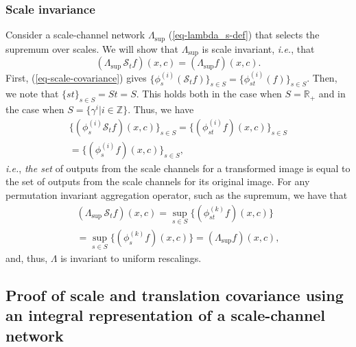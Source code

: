 \documentclass[twocolumn,runningheads]{svjour3}
\def\bbbr{{\mathbb R}}
\def\bbbz{{\mathbb Z}}
\def\calS{\mathcal{S}}
\begin{document}
\subsubsection{Scale invariance}
\label{sec-scale-invariance}

Consider a scale-channel network $\Lambda_{\sup}$
(\ref{eq-lambda_s-def}) that selects the supremum over scales. We will
show that $\Lambda_{\sup}$ is scale invariant, {\em i.e.\/}, that
\begin{equation}
(\Lambda_{\sup}\, \calS_t f)(x,c) = (\Lambda_{\sup} f)(x,c).
\label{eq-scale-invariance}
\end{equation}
First, (\ref{eq-scale-covariance}) gives $\{\phi^{(i)}_s (\calS_t
f)\}_{s \in S} = \{ \phi_{st}^{(i)} (f) \}_{s \in S}$. 
Then, we note that $\{st\}_{s \in S} = St = S$. 
This holds both in the case when $S = \bbbr_+$ and in the case 
when $S = \{\gamma^i |  i \in \bbbz\}$.
Thus, we have
\begin{multline} 
\{(\phi_s^{(i)} \calS_t f)(x,c)\}_{s \in S}
= \{(\phi^{(i)}_{s t} f)(x,c)\}_{s \in S}\\ =  \{(\phi^{(i)}_{s} f)(x,c)\}_{s \in S}
\label{eq-phi_maps_scale},
\end{multline}
{\em i.e.\/}, \emph{the set} of outputs from the scale channels for a
transformed image is equal to the set of outputs from the 
scale channels for its original image.  
For any permutation invariant aggregation operator, 
such as the supremum, we have that
\begin{multline}
(\Lambda_{\sup}\, \calS_t f)(x,c) = \sup_{s \in S} \{(\phi^{(k)}_{s t} f)(x, c)\} \\
=   \sup_{s \in S} \{(\phi^{(k)}_{s} f)(x,c)\}  = (\Lambda_{\sup} f)(x, c),
\label{eq-lambda-scale-invariant}
\end{multline} 
and, thus, $\Lambda$ is invariant to uniform rescalings. 

\subsection{Proof of scale and translation covariance using an integral representation of a scale-channel network}
\label{sec-invariance-covariance-proof}
\end{document}
